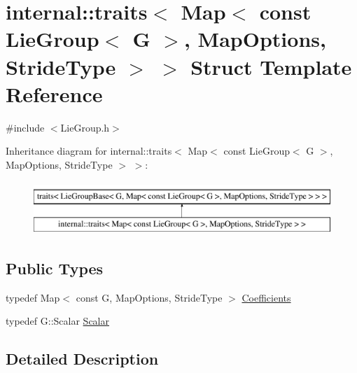 \hypertarget{structinternal_1_1traits_3_01_map_3_01const_01_lie_group_3_01_g_01_4_00_01_map_options_00_01_stride_type_01_4_01_4}{}\section{internal\+:\+:traits$<$ Map$<$ const Lie\+Group$<$ G $>$, Map\+Options, Stride\+Type $>$ $>$ Struct Template Reference}
\label{structinternal_1_1traits_3_01_map_3_01const_01_lie_group_3_01_g_01_4_00_01_map_options_00_01_stride_type_01_4_01_4}


{\ttfamily \#include $<$Lie\+Group.\+h$>$}

Inheritance diagram for internal\+:\+:traits$<$ Map$<$ const Lie\+Group$<$ G $>$, Map\+Options, Stride\+Type $>$ $>$\+:\begin{figure}[H]
\begin{center}
\leavevmode
\includegraphics[height=2.000000cm]{structinternal_1_1traits_3_01_map_3_01const_01_lie_group_3_01_g_01_4_00_01_map_options_00_01_stride_type_01_4_01_4}
\end{center}
\end{figure}
\subsection*{Public Types}
\begin{DoxyCompactItemize}
\item 
typedef Map$<$ const G, Map\+Options, Stride\+Type $>$ \hyperlink{structinternal_1_1traits_3_01_map_3_01const_01_lie_group_3_01_g_01_4_00_01_map_options_00_01_stride_type_01_4_01_4_a8a1d9201a1ced7406d87434e78a1bb94}{Coefficients}
\item 
typedef G\+::\+Scalar \hyperlink{structinternal_1_1traits_3_01_map_3_01const_01_lie_group_3_01_g_01_4_00_01_map_options_00_01_stride_type_01_4_01_4_a3aab625ff94db50623851510a4420ab0}{Scalar}
\end{DoxyCompactItemize}


\subsection{Detailed Description}
